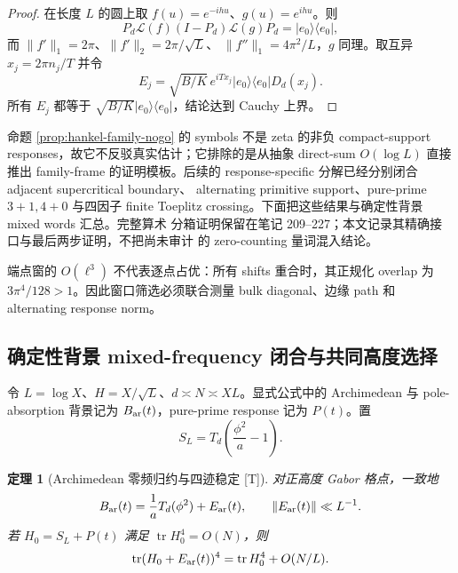 \documentclass[UTF8,11pt,a4paper]{ctexart}
\newtheorem{theorem}{定理}[section]
\theoremstyle{definition}
\theoremstyle{remark}
\begin{document}
\begin{proof}
在长度 $L$ 的圆上取 $f(u)=e^{-ihu}$、$g(u)=e^{ihu}$。则
\[
 P_d\mathcal L(f)(I-P_d)\mathcal L(g)P_d
 =|e_0\rangle\langle e_0|,
\]
而 $\|f'\|_1=2\pi$、$\|f'\|_2=2\pi/\sqrt L$、
$\|f''\|_1=4\pi^2/L$，$g$ 同理。取互异
$x_j=2\pi n_j/T$ 并令
\[
 E_j=\sqrt{B/K}\,e^{iTx_j}
 |e_0\rangle\langle e_0|D_d(x_j).
\]
所有 $E_j$ 都等于 $\sqrt{B/K}|e_0\rangle\langle e_0|$，结论达到
Cauchy 上界。
\end{proof}

命题 \ref{prop:hankel-family-nogo} 的 symbols 不是 zeta 的非负
compact-support responses，故它不反驳真实估计；它排除的是从抽象
direct-sum $O(\log L)$ 直接推出 family-frame 的证明模板。后续的
response-specific 分解已经分别闭合 adjacent supercritical boundary、
alternating primitive support、pure-prime $3+1,4+0$ 与四因子 finite
Toeplitz crossing。下面把这些结果与确定性背景 mixed words 汇总。完整算术
分箱证明保留在笔记 209--227；本文记录其精确接口与最后两步证明，不把尚未审计
的 zero-counting 量词混入结论。

端点窗的 $O(\ell^3)$ 不代表逐点占优：所有 shifts 重合时，其正规化 overlap
为 $3\pi^4/128>1$。因此窗口筛选必须联合测量 bulk diagonal、边缘 path 和
alternating response norm。

\subsection{确定性背景 mixed-frequency 闭合与共同高度选择}

令 $L=\log X$、$H=X/\sqrt L$、$d\asymp N\asymp XL$。显式公式中的
Archimedean 与 pole-absorption 背景记为 $B_{\rm ar}(t)$，pure-prime
response 记为 $P(t)$。置
\[
 S_L=T_d\left(\frac{\phi^2}{a}-1\right).
\]

\begin{theorem}[Archimedean 零频归约与四迹稳定 {[T]}]
\label{thm:arch-background}
对正高度 Gabor 格点，一致地
\[
 B_{\rm ar}(t)
 =\frac1aT_d(\phi^2)+E_{\rm ar}(t),
 \qquad \|E_{\rm ar}(t)\|\ll L^{-1}.
 \label{eq:arch-background}
\]
若 $H_0=S_L+P(t)$ 满足 $\operatorname{tr}H_0^4=O(N)$，则
\[
 \operatorname{tr}(H_0+E_{\rm ar}(t))^4
 =\operatorname{tr}H_0^4+O(N/L).
 \label{eq:arch-fourth-stability}
\]
\end{theorem}
\end{document}
